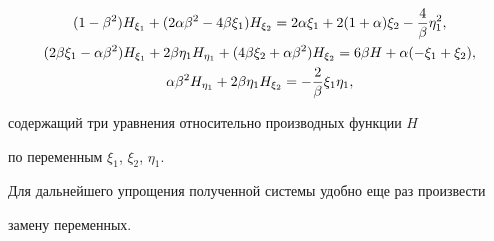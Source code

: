 \begin{gather}


( 1- \beta^2) 


H_{\xi_1} + ( 2 \alpha \beta^2 - 4 \beta \xi_1 ) 


H_{\xi_2} = 


2 \alpha \xi_1 + 2 ( 1 + \alpha) \xi_2 - \frac4{\beta} \eta_1^2,\notag\\


 ( 2 \beta \xi_1- \alpha \beta^2 ) 


H_{\xi_1} +  2 \beta \eta_1 H_{\eta_1} +


( 4 \beta \xi_2 + \alpha \beta^2 ) H_{\xi_2} = 


6 \beta H + \alpha (- \xi_1 + \xi_2 ), \\


 \alpha \beta^2H_{\eta_1} +  2 \beta \eta_1H_{\xi_2} = 


- \frac 2{\beta} \xi_1 \eta_1, \notag


\end{gather}


содержащий три уравнения относительно производных функции $ H $ 


по переменным $ \xi_1$, $\xi_2$, $\eta_1 $. 


 


Для дальнейшего упрощения полученной системы удобно еще раз произвести


замену переменных.





